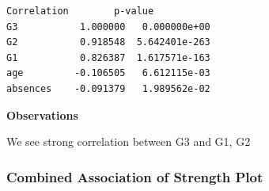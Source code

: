 \documentclass[9pt]{article}
\begin{document}
    \begin{Verbatim}[commandchars=\\\{\}]
          Correlation        p-value
G3           1.000000   0.000000e+00
G2           0.918548  5.642401e-263
G1           0.826387  1.617571e-163
age         -0.106505   6.612115e-03
absences    -0.091379   1.989562e-02
    \end{Verbatim}

    \textbf{Observations}

We see strong correlation between G3 and G1, G2

    \hypertarget{combined-association-of-strength-plot}{%
\subsubsection{Combined Association of Strength
Plot}\label{combined-association-of-strength-plot}}
\end{document}
